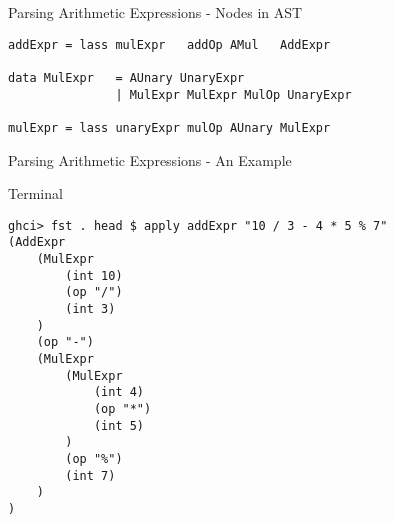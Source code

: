 \documentclass[12pt]{beamer}
\newcommand{\codesize}{\fontsize{7.7}{7.7}}
\begin{document}
\begin{spacing}{1.3}
\begin{frame}[fragile=singleslide]{Parsing Arithmetic Expressions - Nodes in AST}
\begin{verbatim}
addExpr = lass mulExpr   addOp AMul   AddExpr

data MulExpr   = AUnary UnaryExpr
               | MulExpr MulExpr MulOp UnaryExpr

mulExpr = lass unaryExpr mulOp AUnary MulExpr
\end{verbatim}
\end{frame}

\begin{frame}[fragile=singleslide]{Parsing Arithmetic Expressions - An Example}
\begin{block}{Terminal}
\begin{verbatim}
ghci> fst . head $ apply addExpr "10 / 3 - 4 * 5 % 7"
(AddExpr
    (MulExpr
        (int 10)
        (op "/")
        (int 3)
    )
    (op "-")
    (MulExpr
        (MulExpr
            (int 4)
            (op "*")
            (int 5)
        )
        (op "%")
        (int 7)
    )
)
\end{verbatim}
\end{block}
\end{frame}

\end{spacing}
\end{document}
